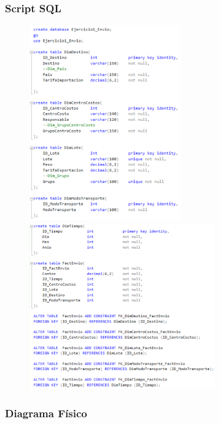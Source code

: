 \documentclass{article}
\begin{document}
\subsubsection{\textbf{Script SQL }}

	\begin{figure}[htb]
		\begin{center}
			\includegraphics[width=6.5cm]{./images/Ejercicio1_script1}
			\includegraphics[width=8cm]{./images/Ejercicio1_script2}
		\end{center}
	\end{figure}
\newpage

\subsubsection{\textbf{Diagrama Físico }}
\end{document}
